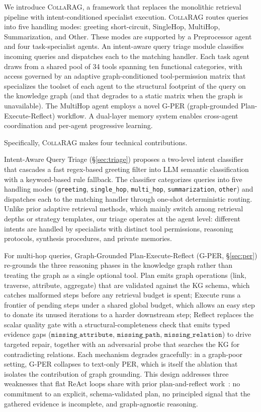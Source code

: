 \documentclass[11pt,a4paper]{article}
\newcommand{\sys}{\textsc{CollaRAG}}
\begin{document}

We introduce \sys{}, a framework that replaces the monolithic retrieval pipeline with intent-conditioned specialist execution.
\sys{} routes queries into five handling modes: greeting short-circuit, SingleHop, MultiHop, Summarization, and Other. These modes are supported by a Preprocessor agent and four task-specialist agents.
An intent-aware query triage module classifies incoming queries and dispatches each to the matching handler.
Each task agent draws from a shared pool of 34 tools spanning ten functional categories, with access governed by an adaptive graph-conditioned tool-permission matrix that specializes the toolset of each agent to the structural footprint of the query on the knowledge graph (and that degrades to a static matrix when the graph is unavailable).
The MultiHop agent employs a novel G-PER (graph-grounded Plan-Execute-Reflect) workflow.
A dual-layer memory system enables cross-agent coordination and per-agent progressive learning.


Specifically, \sys{} makes four technical contributions.

Intent-Aware Query Triage (\S\ref{sec:triage}) proposes a two-level intent classifier that cascades a fast regex-based greeting filter into LLM semantic classification with a keyword-based rule fallback.
The classifier categorizes queries into five handling modes (\texttt{greeting}, \texttt{single\_hop}, \texttt{multi\_hop}, \texttt{summarization}, \texttt{other}) and dispatches each to the matching handler through one-shot deterministic routing.
Unlike prior adaptive retrieval methods, which mainly switch among retrieval depths or strategy templates, our triage operates at the agent level: different intents are handled by specialists with distinct tool permissions, reasoning protocols, synthesis procedures, and private memories.

For multi-hop queries, Graph-Grounded Plan-Execute-Reflect (G-PER, \S\ref{sec:per}) re-grounds the three reasoning phases in the knowledge graph rather than treating the graph as a single optional tool.
Plan emits graph operations (link, traverse, attribute, aggregate) that are validated against the KG schema, which catches malformed steps before any retrieval budget is spent; Execute runs a frontier of pending steps under a shared global budget, which allows an easy step to donate its unused iterations to a harder downstream step; Reflect replaces the scalar quality gate with a structural-completeness check that emits typed evidence gaps ($\texttt{missing\_attribute}$, $\texttt{missing\_path}$, $\texttt{missing\_relation}$) to drive targeted repair, together with an adversarial probe that searches the KG for contradicting relations.
Each mechanism degrades gracefully: in a graph-poor setting, G-PER collapses to text-only PER, which is itself the ablation that isolates the contribution of graph grounding.
This design addresses three weaknesses that flat ReAct loops share with prior plan-and-reflect work~\citep{wang2023plan,shinn2023reflexion}: no commitment to an explicit, schema-validated plan, no principled signal that the gathered evidence is incomplete, and graph-agnostic reasoning.
\end{document}
